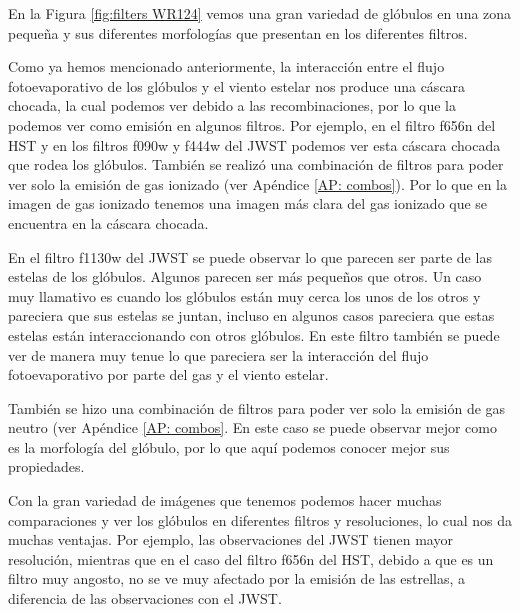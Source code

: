\documentclass{book}
\begin{document}
En la Figura \ref{fig:filters WR124} vemos una gran variedad de glóbulos en una zona pequeña y sus diferentes morfologías que presentan en los diferentes filtros. 

Como ya hemos mencionado anteriormente, la interacción entre el flujo fotoevaporativo de los glóbulos y el viento estelar nos produce una cáscara chocada, la cual podemos ver debido a las recombinaciones, por lo que la podemos ver como emisión en algunos filtros. Por ejemplo, en el filtro f656n del HST y en los filtros f090w y f444w del JWST podemos ver esta cáscara chocada que rodea los glóbulos. También se realizó una combinación de filtros para poder ver solo la emisión de gas ionizado (ver Apéndice \ref{AP: combos}). Por lo que en la imagen de gas ionizado tenemos una imagen más clara del gas ionizado que se encuentra en la cáscara chocada.

En el filtro f1130w del JWST se puede observar lo que parecen ser parte de las estelas de los glóbulos. Algunos parecen ser más pequeños que otros. Un caso muy llamativo es cuando los glóbulos están muy cerca los unos de los otros y pareciera que sus estelas se juntan, incluso en algunos casos pareciera que estas estelas están interaccionando con otros glóbulos. En este filtro también se puede ver de manera muy tenue lo que pareciera ser la interacción del flujo fotoevaporativo por parte del gas y el viento estelar.

También se hizo una combinación de filtros para poder ver solo la emisión de gas neutro (ver Apéndice \ref{AP: combos}. En este caso se puede observar mejor como es la morfología del glóbulo, por lo que aquí podemos conocer mejor sus propiedades.

Con la gran variedad de imágenes que tenemos podemos hacer muchas comparaciones y ver los glóbulos en diferentes filtros y resoluciones, lo cual nos da muchas ventajas. Por ejemplo, las observaciones del JWST tienen mayor resolución, mientras que en el caso del filtro f656n del HST, debido a que es un filtro muy angosto, no se ve muy afectado por la emisión de las estrellas, a diferencia de las observaciones con el JWST.
\end{document}
